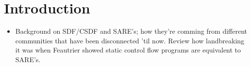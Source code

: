 \section{Introduction}

\begin{itemize}

\item Background on SDF/CSDF and SARE's; how they're comming from
different communities that have been disconnected 'til now.  Review
how landbreaking it was when Feautrier showed static control flow
programs are equivalent to SARE's.

\end{itemize}
